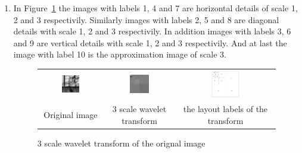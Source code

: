 \documentclass[a4paper]{article}
\begin{document}
\begin{enumerate}

\item
In Figure~\ref{fig:wavelet} the images with labels 1, 4 and 7 are horizontal details of scale 1, 2 and 3 respectivily.
Similarly images with labels 2, 5 and 8 are diagonal details with scale 1, 2 and 3 respectivily.
In addition images with labels 3, 6 and 9 are vertical details with scale 1, 2 and 3 respectivily.
And at last the image with label 10 is the approximation image of scale 3.
\begin{figure}[H]
\centering
\begin{tabular}{ccc}
    \includegraphics[width=0.3\textwidth]{../lab3ex2/vase.png} & \includegraphics[width=0.3\textwidth]{../lab3ex2/scaled.png}  & \includegraphics[width=0.3\textwidth]{layout.png}\\
    Original image & 3 scale wavelet transform & the layout labels of the transform \\
\end{tabular}
\caption{3 scale wavelet transform of the orignal image}
\label{fig:wavelet}
\end{figure}


\end{enumerate}
\end{document}

